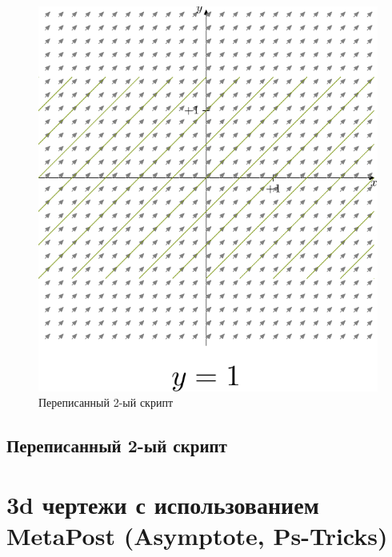 \begin{figure}[h]
    \includegraphics{myfig2-1.pdf}
    \centering
    \caption{Переписанный 2-ый скрипт}
\end{figure}

\section*{Переписанный 2-ый скрипт}



\chapter{3d чертежи с использованием MetaPost (Asymptote, Ps-Tricks)}

